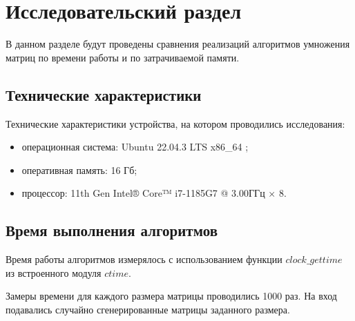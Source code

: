 \chapter{Исследовательский раздел}

В данном разделе будут проведены сравнения реализаций алгоритмов умножения матриц  по времени работы и по затрачиваемой памяти.

\section{Технические характеристики}

Технические характеристики устройства, на котором проводились исследования: 

\begin{itemize}[label=--]
	\item операционная система: Ubuntu 22.04.3 LTS x86\_64 \cite{os};
	\item оперативная память: 16 Гб;
	\item процессор: 11th Gen Intel® Core™ i7-1185G7 @ 3.00ГГц × 8.
\end{itemize}

\section{Время выполнения алгоритмов}

Время работы алгоритмов измерялось с использованием функции $clock\_gettime$ из встроенного модуля $ctime$. 

Замеры времени для каждого размера матрицы проводились 1000 раз. На вход подавались случайно сгенерированные матрицы заданного размера. 


